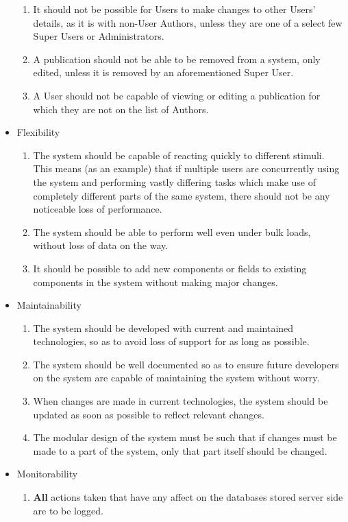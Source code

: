 \documentclass[hidelinks,a4paper,12pt]{article}
\begin{document}
\begin{itemize}
\begin{enumerate}
		\item It should not be possible for Users to make changes to other Users' details, as it is with non-User Authors, unless they are one of a select few Super Users or Administrators.
		\item A publication should not be able to be removed from a system, only edited, unless it is removed by an aforementioned Super User.
		\item A User should not be capable of viewing or editing a publication for which they are not on the list of Authors.
	\end{enumerate}
	\item Flexibility
	\begin{enumerate}
		\item The system should be capable of reacting quickly to different stimuli. This means (as an example) that if multiple users are concurrently using the system and performing vastly differing tasks which make use of completely different parts of the same system, there should not be any noticeable loss of performance.
		\item The system should be able to perform well even under bulk loads, without loss of data on the way.
		\item It should be possible to add new components or fields to existing components in the system without making major changes. 
	\end{enumerate}
	\item Maintainability
	\begin{enumerate}
		\item The system should be developed with current and maintained technologies, so as to avoid loss of support for as long as possible.
		\item The system should be well documented so as to ensure future developers on the system are capable of maintaining the system without worry.
		\item When changes are made in current technologies, the system should be updated as soon as possible to reflect relevant changes.
		\item The modular design of the system must be such that if changes must be made to a part of the system, only that part itself should be changed.
	\end{enumerate}
	\item Monitorability 
	\begin{enumerate}
		\item \textbf{All} actions taken that have any affect on the databases stored server side are to be logged.

\end{enumerate}
\end{itemize}
\end{document}
